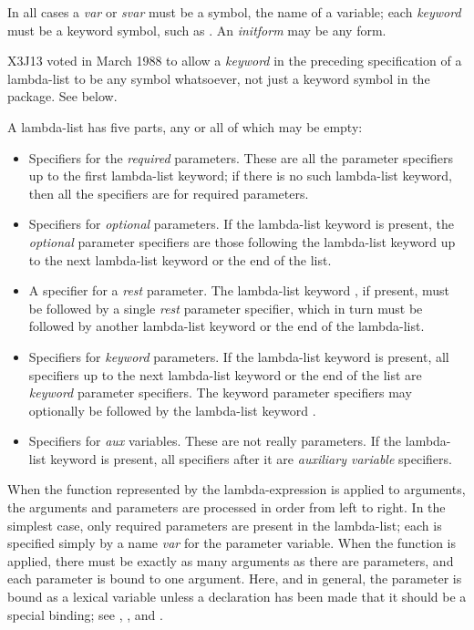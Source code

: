 \begin{obsolete}
In all cases a \emph{var} or \emph{svar} must be a symbol, the name of a variable;
each \emph{keyword} must be a keyword symbol, such as .
An \emph{initform} may be any form.
\end{obsolete}

\begin{newer}
X3J13 voted in March 1988 
to allow a \emph{keyword} in the preceding specification of a lambda-list
to be any symbol whatsoever, not just a keyword symbol
in the  package.  See below.
\end{newer}

A lambda-list has five parts, any or all of which may be empty:

\begin{itemize}
\item
Specifiers for the \emph{required} parameters.  These are all the parameter
specifiers up to the first lambda-list keyword; if there is no such
lambda-list keyword, then all the specifiers are for required parameters.

\item
Specifiers for \emph{optional} parameters.
If the lambda-list keyword  is present,
the \emph{optional} parameter specifiers are those following the
lambda-list keyword  up to the next lambda-list keyword or the
end of the list.

\item
A specifier for a \emph{rest} parameter.  The lambda-list keyword , if present, must
be followed by a single \emph{rest} parameter specifier,
which in turn must be followed by another lambda-list keyword or the end
of the lambda-list.

\item
Specifiers for \emph{keyword} parameters.
If the lambda-list keyword  is present, all specifiers up to the next lambda-list keyword
or the end of the list are \emph{keyword} parameter specifiers.
The keyword parameter specifiers may optionally be followed by the
lambda-list keyword .

\item
Specifiers for \emph{aux} variables.  These are not really parameters.
If the lambda-list keyword  is present, all specifiers after it are
\emph{auxiliary variable} specifiers.
\end{itemize}

When the function represented by the lambda-expression is applied
to arguments, the arguments and parameters are processed in order
from left to right.
In the simplest case, only required parameters are present
in the lambda-list; each is specified simply by a name \emph{var} for
the parameter variable.
When the function is applied,
there must be exactly as many arguments as there are parameters,
and each parameter is bound to one argument.  Here, and in general,
the parameter is bound as a lexical variable unless a
declaration has been made that it should be a special binding;
see , , and .


